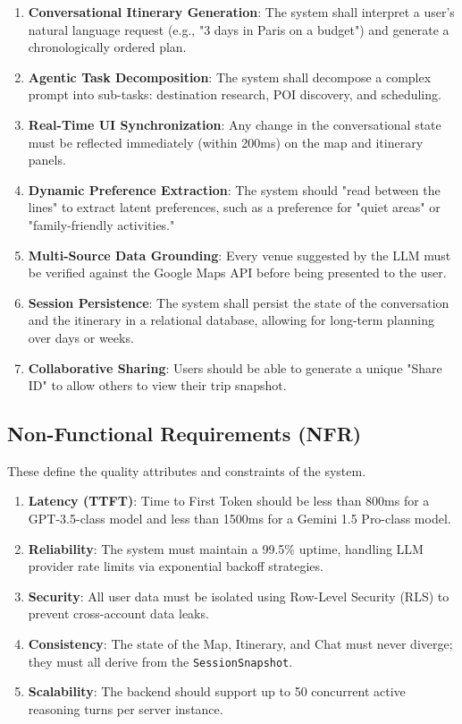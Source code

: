 \documentclass[12pt,a4paper]{report}
\begin{document}
\begin{enumerate}[leftmargin=*, label=\textbf{FR\arabic*.}]
    \item \textbf{Conversational Itinerary Generation}: The system shall interpret a user's natural language request (e.g., "3 days in Paris on a budget") and generate a chronologically ordered plan.
    \item \textbf{Agentic Task Decomposition}: The system shall decompose a complex prompt into sub-tasks: destination research, POI discovery, and scheduling.
    \item \textbf{Real-Time UI Synchronization}: Any change in the conversational state must be reflected immediately (within 200ms) on the map and itinerary panels.
    \item \textbf{Dynamic Preference Extraction}: The system should "read between the lines" to extract latent preferences, such as a preference for "quiet areas" or "family-friendly activities."
    \item \textbf{Multi-Source Data Grounding}: Every venue suggested by the LLM must be verified against the Google Maps API before being presented to the user.
    \item \textbf{Session Persistence}: The system shall persist the state of the conversation and the itinerary in a relational database, allowing for long-term planning over days or weeks.
    \item \textbf{Collaborative Sharing}: Users should be able to generate a unique "Share ID" to allow others to view their trip snapshot.
\end{enumerate}

\subsection{Non-Functional Requirements (NFR)}
These define the quality attributes and constraints of the system.

\begin{enumerate}[leftmargin=*, label=\textbf{NFR\arabic*.}]
    \item \textbf{Latency (TTFT)}: Time to First Token should be less than 800ms for a GPT-3.5-class model and less than 1500ms for a Gemini 1.5 Pro-class model.
    \item \textbf{Reliability}: The system must maintain a 99.5\% uptime, handling LLM provider rate limits via exponential backoff strategies.
    \item \textbf{Security}: All user data must be isolated using Row-Level Security (RLS) to prevent cross-account data leaks.
    \item \textbf{Consistency}: The state of the Map, Itinerary, and Chat must never diverge; they must all derive from the \texttt{SessionSnapshot}.
    \item \textbf{Scalability}: The backend should support up to 50 concurrent active reasoning turns per server instance.
\end{enumerate}
\end{document}
